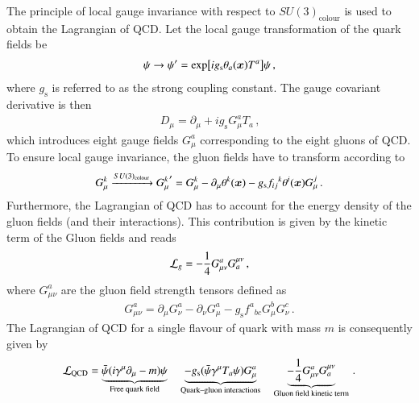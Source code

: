 The principle of local gauge invariance with respect to $SU(3)_{\text{colour}}$
is used to obtain the Lagrangian of QCD. Let the local gauge transformation of
the quark fields be
\begin{align*}
  \psi \to \psi^\prime = \exp[ i g_{\text{s}} \theta_a(\bm{x}) T^a] \psi \,\text{,}
\end{align*}
where $g_{\text{s}}$ is referred to as the strong coupling constant. The gauge
covariant derivative is then
\begin{align*}
  D_\mu = \partial_\mu + i g_{\text{s}} G_\mu^a T_a \,\text{,}
\end{align*}
which introduces eight gauge fields $G_\mu^a$ corresponding to the eight gluons
of QCD. To ensure local gauge invariance, the gluon fields have to transform
according to
\begin{align*}
  G_\mu^k \xrightarrow{SU(3)_{\text{colour}}} {G_\mu^k}^\prime = G_\mu^k  - \partial_\mu \theta^k(\bm{x}) - g_{\text{s}} {f_{ij}}^k \theta^i(\bm{x}) G_\mu^j \,\text{.}
\end{align*}
Furthermore, the Lagrangian of QCD has to account for the energy density of the
gluon fields (and their interactions). This contribution is given by the kinetic
term of the Gluon fields and reads
\begin{align*}
  \mathcal{L}_{g} = - \frac{1}{4} G_{\mu\nu}^{a} G^{\mu\nu}_{a} \,\text{,}
\end{align*}
where $G_{\mu\nu}^a$ are the gluon field strength tensors defined as
\begin{align*}
  G_{\mu\nu}^a = \partial_\mu G_\nu^a - \partial_\nu G_\mu^a - g_{\text{s}} {f^{a}}_{bc} G_\mu^b G_\nu ^c \,\text{.}
\end{align*}
The Lagrangian of QCD for a single flavour of quark with mass $m$ is
consequently given by
\begin{align*}
  \mathcal{L}_{\text{QCD}} =
  \underbrace{\bar{\psi} (i \gamma^\mu \partial_\mu - m) \psi}_{\text{Free quark field}}
  \hspace*{1em}
  \underbrace{- g_{\text{s}} (\bar{\psi} \gamma^\mu T_a \psi) G_\mu^a}_{\text{Quark--gluon interactions}}
  \hspace*{1em}
  \underbrace{- \frac{1}{4} G_{\mu\nu}^a G^{\mu\nu}_a}_{\text{Gluon field kinetic term}} \,\text{.}
\end{align*}
